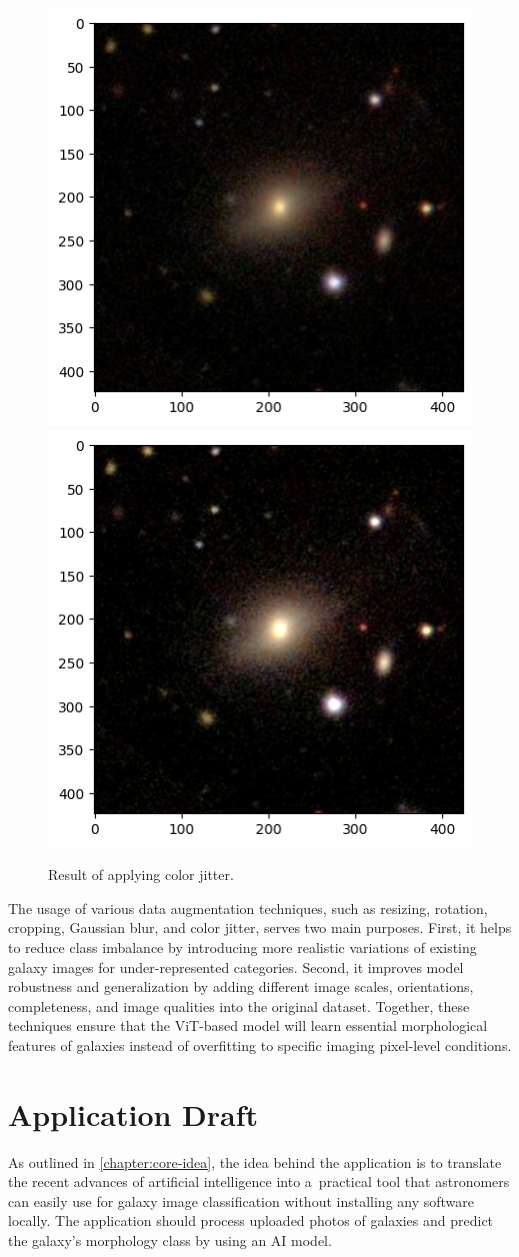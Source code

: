 \begin{figure}[htbp]\centering
  \centering
  \includegraphics[width=0.5\linewidth]{obrazky-figures/03-dataset/orig.png}\hfill
  \includegraphics[width=0.5\linewidth]{obrazky-figures/03-dataset/jitter.png}
  \caption{Result of applying color jitter.}
  \label{fig:dataset-jitter}
\end{figure}

The usage of various data augmentation techniques, such as resizing, rotation, cropping, Gaussian blur, and color jitter, serves two main purposes. First, it helps to reduce class imbalance by introducing more realistic variations of existing galaxy images for under-represented categories. Second, it improves model robustness and generalization by adding different image scales, orientations, completeness, and image qualities into the original dataset. Together, these techniques ensure that the ViT-based model will learn essential morphological features of galaxies instead of overfitting to specific imaging pixel-level conditions.

\chapter{Application Draft}

As outlined in \autoref{chapter:core-idea}, the idea behind the application is to translate the recent advances of artificial intelligence into a~practical tool that astronomers can easily use for galaxy image classification without installing any software locally. The application should process uploaded photos of galaxies and predict the galaxy's morphology class by using an AI model.

